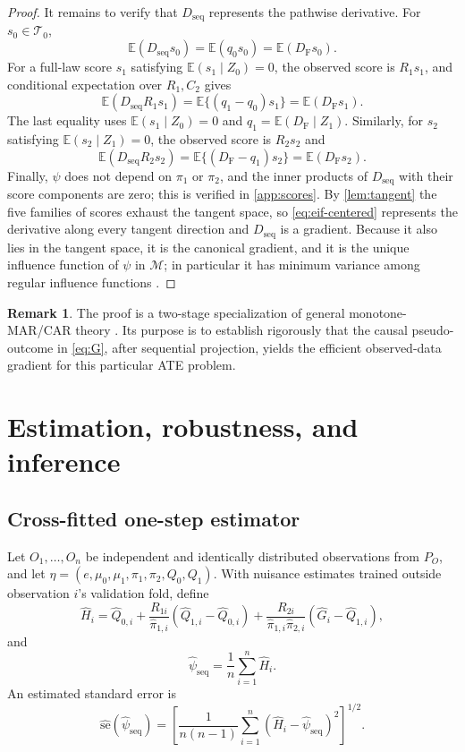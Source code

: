 \documentclass[11pt]{article}
\theoremstyle{definition}
\newtheorem{remark}{Remark}
\newcommand{\E}{\mathbb{E}}
\newcommand{\1}{\mathbf{1}}
\newcommand{\seq}{\mathrm{seq}}
\newcommand{\F}{\mathrm{F}}
\begin{document}
\begin{proof}
It remains to verify that $D_{\seq}$ represents the pathwise derivative. For $s_0\in\mathcal T_0$,
\[
\E(D_{\seq}s_0)=\E(q_0s_0)=\E(D_{\F}s_0).
\]
For a full-law score $s_1$ satisfying $\E(s_1\mid Z_0)=0$, the observed score is $R_1s_1$, and conditional expectation over $R_1,C_2$ gives
\[
\E(D_{\seq}R_1s_1)=\E\{(q_1-q_0)s_1\}=\E(D_{\F}s_1).
\]
The last equality uses $\E(s_1\mid Z_0)=0$ and $q_1=\E(D_{\F}\mid Z_1)$. Similarly, for $s_2$ satisfying $\E(s_2\mid Z_1)=0$, the observed score is $R_2s_2$ and
\[
\E(D_{\seq}R_2s_2)=\E\{(D_{\F}-q_1)s_2\}=\E(D_{\F}s_2).
\]
Finally, $\psi$ does not depend on $\pi_1$ or $\pi_2$, and the inner products of
$D_{\seq}$ with their score components are zero; this is verified in
\cref{app:scores}. By \cref{lem:tangent} the five families of scores exhaust the
tangent space, so \cref{eq:eif-centered} represents the derivative along every
tangent direction and $D_{\seq}$ is a gradient. Because it also lies in the
tangent space, it is the canonical gradient, and it is the unique influence
function of $\psi$ in $\mathcal M$; in particular it has minimum variance among
regular influence functions \citep{tsiatis2006}.
\end{proof}

\begin{remark}
The proof is a two-stage specialization of general monotone-MAR/CAR theory \citep{rrz1994,gill1997,barnwell2025}. Its purpose is to establish rigorously that the causal pseudo-outcome in \cref{eq:G}, after sequential projection, yields the efficient observed-data gradient for this particular ATE problem.
\end{remark}

\section{Estimation, robustness, and inference}

\subsection{Cross-fitted one-step estimator}

Let $O_1,\ldots,O_n$ be independent and identically distributed observations from $P_O$, and let $\eta=(e,\mu_0,\mu_1,\pi_1,\pi_2,Q_0,Q_1)$. With nuisance estimates trained outside observation $i$'s validation fold, define
\begin{equation}\label{eq:Hhat}
\widehat H_i=\widehat Q_{0,i}
+\frac{R_{1i}}{\widehat\pi_{1,i}}(\widehat Q_{1,i}-\widehat Q_{0,i})
+\frac{R_{2i}}{\widehat\pi_{1,i}\widehat\pi_{2,i}}
(\widehat G_i-\widehat Q_{1,i}),
\end{equation}
and
\begin{equation}\label{eq:estimator}
\widehat\psi_{\seq}=\frac{1}{n}\sum_{i=1}^n\widehat H_i.
\end{equation}
An estimated standard error is
\begin{equation}\label{eq:se}
\widehat{\mathrm{se}}(\widehat\psi_{\seq})
=\left[\frac{1}{n(n-1)}\sum_{i=1}^n
(\widehat H_i-\widehat\psi_{\seq})^2\right]^{1/2}.
\end{equation}
\end{document}
